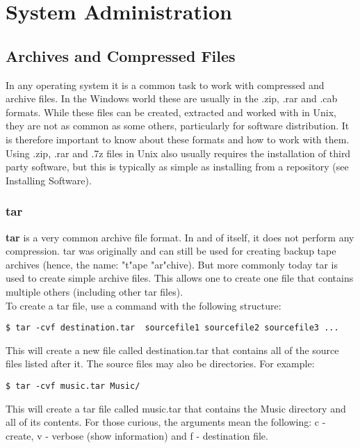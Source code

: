 \chapter{System Administration}

\section{Archives and Compressed Files}

In any operating system it is a common task to work with compressed and archive files.  In the Windows world these are usually in the .zip, .rar and .cab formats.  While these files can be created, extracted and worked with in Unix, they are not as common as some others, particularly for software distribution.  It is therefore important to know about these formats and how to work with them.  Using .zip, .rar and .7z files in Unix also usually requires the installation of third party software, but this is typically as simple as installing from a repository (see Installing Software).

\subsection{tar}

\textbf{tar} is a very common archive file format.  In and of itself, it does not perform any compression.  tar was originally and can still be used for creating backup tape archives (hence, the name: "t"ape "ar"chive).  But more commonly today tar is used to create simple archive files.  This allows one to create one file that contains multiple others (including other tar files).\\

To create a tar file, use a command with the following structure:

\begin{verbatim}
$ tar -cvf destination.tar  sourcefile1 sourcefile2 sourcefile3 ...
\end{verbatim}

This will create a new file called destination.tar that contains all of the source files listed after it.  The source files may also be directories.  For example:

\begin{verbatim}
$ tar -cvf music.tar Music/
\end{verbatim}

This will create a tar file called music.tar that contains the Music directory and all of its contents.  For those curious, the arguments mean the following: c - create, v - verbose (show information) and f - destination file.

